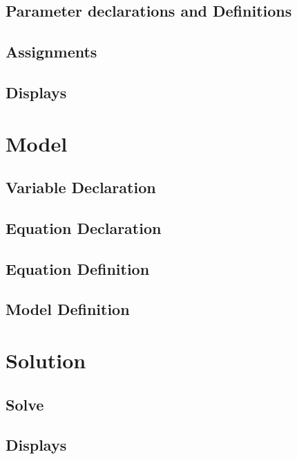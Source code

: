 \documentclass[10pt]{article}
\begin{document}
    \subsection{Parameter declarations and Definitions}
    \label{data:ParaDeclaNDef}

    \subsection{Assignments}
    \label{data:assingments}

    \subsection{Displays}
    \label{data:displays}
    
  \section{Model}
  \label{model}
    \subsection{Variable Declaration}
    \label{model:VarDec}

    \subsection{Equation Declaration}
    \label{model:EquationDec}
    
    \subsection{Equation Definition}
    \label{model:EquationDef}

    \subsection{Model Definition}
    \label{model:ModelDefinition}

  \section{Solution}
  \label{solution}
    
    \subsection{Solve}
    \label{solution:solve}
    
    \subsection{Displays}
    \label{solution:displays}
\end{document}
